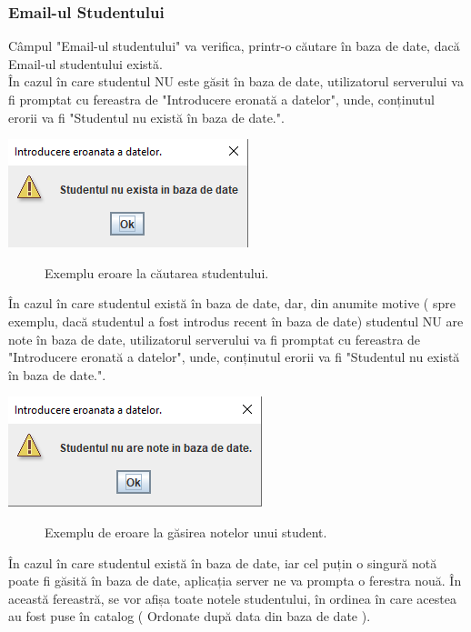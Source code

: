 \documentclass{article}
\begin{document}
	\subsubsection*{Email-ul Studentului}
		  Câmpul "Email-ul studentului" va verifica, printr-o căutare în baza de date, dacă Email-ul studentului există. \\

		În cazul în care studentul NU este găsit în baza de date, utilizatorul serverului va fi promptat cu fereastra de "Introducere eronată a datelor", unde, conținutul erorii va fi "Studentul nu există în baza de date.".
	
	\begin{center}
		\includegraphics[scale=0.8]{Source/ServerScoateEroare}
		\begin{figure}[!h]
			{\caption*{Exemplu eroare la căutarea studentului.}}
		\end{figure}
	\end{center}

		În cazul în care studentul există în baza de date, dar, din anumite motive ( spre exemplu, dacă studentul a fost introdus recent în baza de date) studentul NU are note în baza de date, utilizatorul serverului va fi promptat cu fereastra de "Introducere eronată a datelor", unde, conținutul erorii va fi "Studentul nu există în baza de date.".

	\begin{center}
		\includegraphics[scale=0.8]{Source/ServerScoateEroare1}
		\begin{figure}[!h]
			{\caption*{Exemplu de eroare la găsirea notelor unui student.}}
		\end{figure}
	\end{center}

		În cazul în care studentul există în baza de date, iar cel puțin o singură notă poate fi găsită în baza de date, aplicația server ne va prompta o ferestra nouă. În această fereastră, se vor afișa toate notele studentului, în ordinea în care acestea au fost puse în catalog ( Ordonate după data din baza de date ).\\
\end{document}
